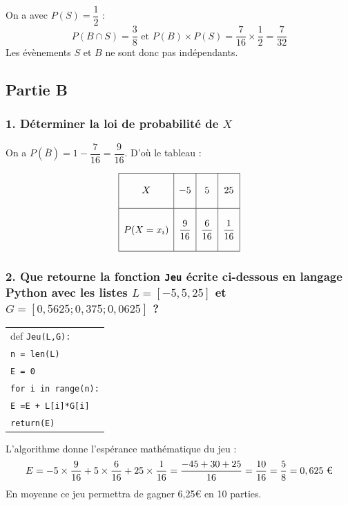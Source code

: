 \documentclass[10pt]{article}
\providecommand{\euro}{\texteuro}
\providecommand{\euro}{{\text{€}}}
\renewcommand{\euro}{\ifmmode\text{\texteuro}\else\texteuro\fi}
\begin{document}
	On a avec $P(S) = \dfrac{1}{2}$ :
	\[
	P(B \cap S) = \dfrac{3}{8} \text{ et } P(B) \times P(S) = \dfrac{7}{16} \times \dfrac{1}{2} = \dfrac{7}{32}
	\]
	Les évènements $S$ et $B$ ne sont donc pas indépendants.
	
	\subsection*{Partie B}
	

	
	\subsubsection*{1. Déterminer la loi de probabilité de $X$}
	
	On a $P(\overline{B}) = 1 - \dfrac{7}{16} = \dfrac{9}{16}$. D’où le tableau :
	
	\[
	\begin{array}{|c|c|c|c|}
		\hline
		&&&\\
		X & -5 & 5 & 25 \\
		&&&\\
		\hline
		&&&\\
		P(X = x_i) & \dfrac{9}{16} & \dfrac{6}{16} & \dfrac{1}{16} \\
		&&&\\
		\hline
	\end{array}
	\]
	
	\subsubsection*{2. Que retourne la fonction \texttt{Jeu} écrite ci-dessous en langage Python avec les listes $L = [-5, 5, 25]$ et $G = [0,5625; 0,375; 0,0625]$ ?}
	
\begin{center}
	
	\begin{tabularx}{0.4\linewidth}{|X|}\hline
		def \texttt{Jeu(L,G):}\\
		\quad  \texttt{n = len(L)}\\
		\quad \texttt{E = 0}\\
		\quad \texttt{for i in range(n):}\\
		\qquad \texttt{E =E + L[i]*G[i]} \\
		\quad \texttt{return(E)}\\ \hline
	\end{tabularx}
\end{center}
	
	L’algorithme donne l’espérance mathématique du jeu :
	\[
	E = -5 \times \dfrac{9}{16} + 5 \times \dfrac{6}{16} + 25 \times \dfrac{1}{16} = \dfrac{-45 + 30 + 25}{16} = \dfrac{10}{16} = \dfrac{5}{8} = 0,625~\euro{}
	\]
	En moyenne ce jeu permettra de gagner 6,25€ en 10 parties.
\end{document}
